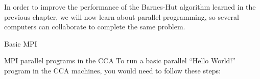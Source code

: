 
In order to improve the performance of the Barnes-Hut algorithm learned in the
previous chapter, we will now learn about parallel programming, so several
computers can collaborate to complete the same problem.


 {Basic MPI}
\label{sec:basic-mpi}

%

%
%

 {MPI parallel programs in the CCA}
To run a basic parallel ``Hello World!'' program in the CCA machines, you would
need to follow these steps:

